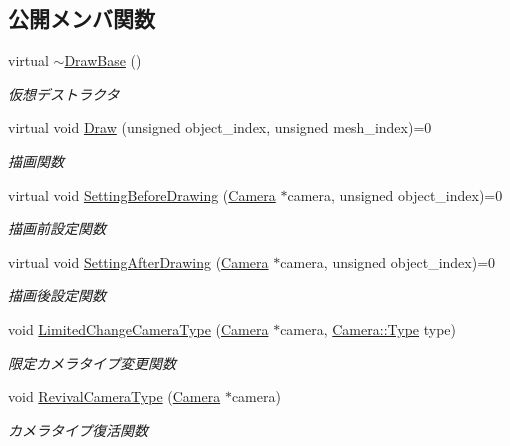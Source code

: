 \subsection*{公開メンバ関数}
\begin{DoxyCompactItemize}
\item 
virtual \mbox{\hyperlink{class_draw_base_a799597f696c5cbf6074fb2655dea5e18}{$\sim$\+Draw\+Base}} ()
\begin{DoxyCompactList}\small\item\em 仮想デストラクタ \end{DoxyCompactList}\item 
virtual void \mbox{\hyperlink{class_draw_base_a408080106630a1146d7af0bb46a4d8d1}{Draw}} (unsigned object\+\_\+index, unsigned mesh\+\_\+index)=0
\begin{DoxyCompactList}\small\item\em 描画関数 \end{DoxyCompactList}\item 
virtual void \mbox{\hyperlink{class_draw_base_a3978252914ddde12197ea4577356bf25}{Setting\+Before\+Drawing}} (\mbox{\hyperlink{class_camera}{Camera}} $\ast$camera, unsigned object\+\_\+index)=0
\begin{DoxyCompactList}\small\item\em 描画前設定関数 \end{DoxyCompactList}\item 
virtual void \mbox{\hyperlink{class_draw_base_afe64f27b0bbf8c45da7aa0de4c3f3d65}{Setting\+After\+Drawing}} (\mbox{\hyperlink{class_camera}{Camera}} $\ast$camera, unsigned object\+\_\+index)=0
\begin{DoxyCompactList}\small\item\em 描画後設定関数 \end{DoxyCompactList}\item 
void \mbox{\hyperlink{class_draw_base_aa18abd488181eed72822f92a0f2521fe}{Limited\+Change\+Camera\+Type}} (\mbox{\hyperlink{class_camera}{Camera}} $\ast$camera, \mbox{\hyperlink{class_camera_a3b0a1f58deca679ac665f61c480d1dcb}{Camera\+::\+Type}} type)
\begin{DoxyCompactList}\small\item\em 限定カメラタイプ変更関数 \end{DoxyCompactList}\item 
void \mbox{\hyperlink{class_draw_base_a48b144e61928b7658c7a849017e40c79}{Revival\+Camera\+Type}} (\mbox{\hyperlink{class_camera}{Camera}} $\ast$camera)
\begin{DoxyCompactList}\small\item\em カメラタイプ復活関数 \end{DoxyCompactList}\item 

\end{DoxyCompactItemize}
